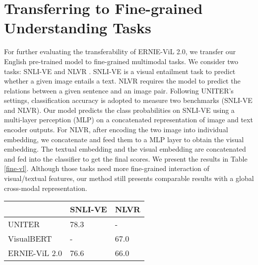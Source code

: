 \documentclass{article}
\begin{document}
\section{Transferring to Fine-grained Understanding Tasks}
\label{Transferring_fine-grained_understanding_tasks}
For further evaluating the transferability of ERNIE-ViL 2.0, we transfer our English pre-trained model to fine-grained multimodal tasks. We consider two tasks: SNLI-VE \cite{xie2019visual} and NLVR \cite{suhr-etal-2019-corpus}. SNLI-VE is a visual entailment task to predict whether a given image entails a text. NLVR requires the model to predict the relations between a given sentence and an image pair. Following UNITER's \cite{chen2020uniter} settings, classification accuracy is adopted to measure two benchmarks (SNLI-VE and NLVR). Our model predicts the class probabilities on SNLI-VE using a multi-layer perception (MLP) on a concatenated representation of image and text encoder outputs. 
For NLVR, after encoding the two image into individual embedding, we concatenate and feed them to a MLP layer to obtain the visual embedding. The textual embedding and the visual embedding are concatenated and fed into the classifier to get the final scores. 
We present the results in Table \ref{fine-vl}. Although those tasks need more fine-grained interaction of visual/textual features, our method still presents comparable results with a global cross-modal representation.
 \begin{table*}
\centering
\begin{tabular}{@{}l|ll@{}}
\toprule
& SNLI-VE & NLVR \\ \midrule
UNITER          & 78.3    & -     \\
VisualBERT      & -       & 67.0  \\
ERNIE-ViL 2.0 & 76.6    & 66.0  \\ \bottomrule
\end{tabular}
\caption{Compared with previous methods with Fine-grained vision-language interaction on V+L downstream tasks: SNLI-VE and NLVR2, ERNIE-ViL 2.0 present comparable results with shallow cross-modal interaction }
\label{fine-vl}
\end{table*}
\end{document}
